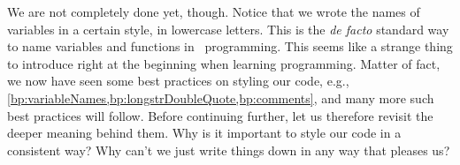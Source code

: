 We are not completely done yet, though.
Notice that we wrote the names of variables in a certain style, in lowercase letters.
This is the \emph{de facto} standard way to name variables and functions in \python\ programming.%
%
%
This seems like a strange thing to introduce right at the beginning when learning programming.
Matter of fact, we now have seen some best practices on styling our code, e.g., \cref{bp:variableNames,bp:longstrDoubleQuote,bp:comments}, and many more such best practices will follow.
Before continuing further, let us therefore revisit the deeper meaning behind them.
Why is it important to style our code in a consistent way?
Why can't we just write things down in any way that pleases us?

